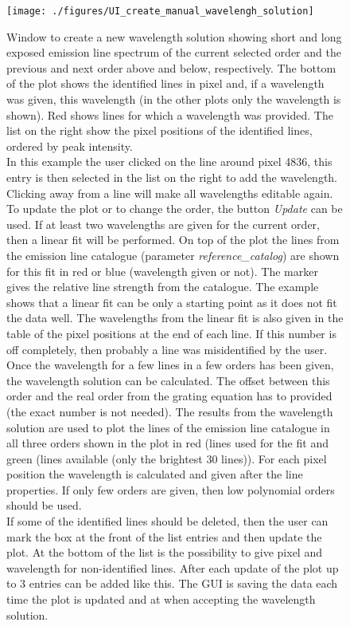 \documentclass[10pt,a4paper]{article}
\begin{document}
\begin{figure} 
  \begin{center}
    \texttt{[image: ./figures/UI\_create\_manual\_wavelengh\_solution]}
  \end{center} 
  \caption{Window to create a new wavelength solution showing short and long exposed emission line spectrum of the current selected order and the previous and next order above and below, respectively. The bottom of the plot shows the identified lines in pixel and, if a wavelength was given, this wavelength (in the other plots only the wavelength is shown). Red shows lines for which a wavelength was provided. The list on the right show the pixel positions of the identified lines, ordered by peak intensity. \\
    In this example the user clicked on the line around pixel 4836, this entry is then selected in the list on the right to add the wavelength. Clicking away from a line will make all wavelengths editable again. \\
    To update the plot or to change the order, the button \textit{Update} can be used. If at least two wavelengths are given for the current order, then a linear fit will be performed. On top of the plot the lines from the emission line catalogue (parameter \textit{reference\_catalog}) are shown for this fit in red or blue (wavelength given or not). The marker gives the relative line strength from the catalogue. The example shows that a linear fit can be only a starting point as it does not fit the data well. The wavelengths from the linear fit is also given in the table of the pixel positions at the end of each line. If this number is off completely, then probably a line was misidentified by the user. \\
    Once the wavelength for a few lines in a few orders has been given, the wavelength solution can be calculated. The offset between this order and the real order from the grating equation has to provided (the exact number is not needed). The results from the wavelength solution are used to plot the lines of the emission line catalogue in all three orders shown in the plot in red (lines used for the fit and green (lines available (only the brightest 30 lines)). For each pixel position the wavelength is calculated and given after the line properties. If only few orders are given, then low polynomial orders should be used. \\
    If some of the identified lines should be deleted, then the user can mark the box at the front of the list entries and then update the plot. At the bottom of the list is the possibility to give pixel and wavelength for non-identified lines. After each update of the plot up to 3 entries can be added like this. The GUI is saving the data each time the plot is updated and at when accepting the wavelength solution.
    \label{Fig:UI_create_manual_wavelengh_solution}}
\end{figure}
\end{document}
